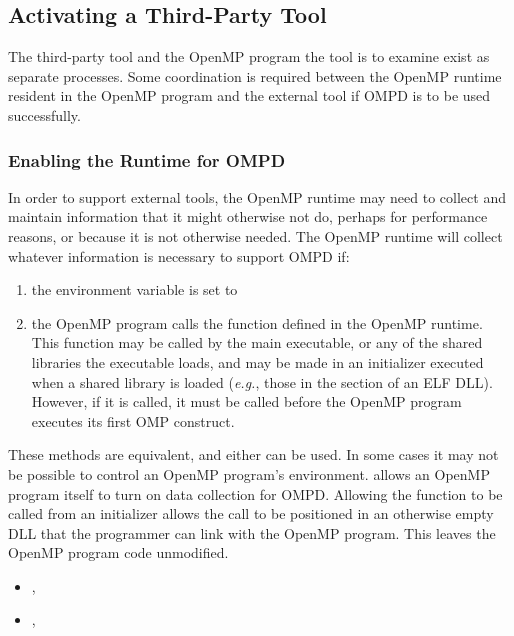 \subsection{Activating a Third-Party Tool}
\label{sec:ompd:activating}

The third-party tool and the OpenMP program the tool is to examine
exist as separate processes.
Some coordination is required between the OpenMP runtime resident
in the OpenMP program and the external tool if OMPD is to be used
successfully.

\subsubsection{Enabling the Runtime for OMPD}
\label{sec:ompd:enabling-ompd}

In order to support external tools, the OpenMP runtime may need to collect
and maintain information that it might otherwise not do, perhaps
for performance reasons, or because it is not otherwise needed.
The OpenMP runtime will collect whatever information is necessary
to support OMPD if:
\begin{enumerate}
\item
  the environment variable  is set to 
\item
  the OpenMP program calls the
  function defined in the OpenMP runtime.
  This function may be called by the main executable, or any of the
  shared libraries the executable loads, and may be made in an
  initializer executed when a shared library is loaded
  (\textit{e.g.}, those in the  section of an ELF DLL).
  However, if it is called, it must be called before the OpenMP program
  executes its first OMP construct.
\end{enumerate}
These methods are equivalent, and either can be used.
In some cases it may not be possible to control an OpenMP program's
environment.
 allows an OpenMP program itself to turn on
data collection for OMPD.
Allowing the function to be called from an initializer allows
the call to be positioned in an otherwise empty DLL that the
programmer can link with the OpenMP program.
This leaves the OpenMP program code unmodified.

\crossreferences
\begin{itemize}
\item
  , 
\item
  , 
\end{itemize}

